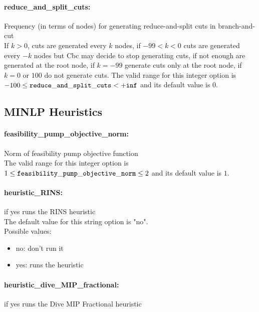 \paragraph{reduce\_and\_split\_cuts:}\label{sec:reduce_and_split_cuts} Frequency (in terms of nodes) for generating reduce-and-split cuts in branch-and-cut $\;$ \\
 If $k > 0$, cuts are generated every $k$ nodes,
if $-99 < k < 0$ cuts are generated every $-k$
nodes but Cbc may decide to stop generating cuts,
if not enough are generated at the root node, if
$k=-99$ generate cuts only at the root node, if
$k=0$ or $100$ do not generate cuts. The valid range for this integer option is
$-100 \le {\tt reduce\_and\_split\_cuts } <  {\tt +inf}$
and its default value is $0$.


\subsection{MINLP Heuristics}
\label{sec:MINLP_Heuristics}
\paragraph{feasibility\_pump\_objective\_norm:}\label{sec:feasibility_pump_objective_norm} Norm of feasibility pump objective function $\;$ \\
 The valid range for this integer option is
$1 \le {\tt feasibility\_pump\_objective\_norm } \le 2$
and its default value is $1$.


\paragraph{heuristic\_RINS:}\label{sec:heuristic_RINS} if yes runs the RINS heuristic $\;$ \\

The default value for this string option is "no".
\\ 
Possible values:
\begin{itemize}
   \item no: don't run it
   \item yes: runs the heuristic
\end{itemize}

\paragraph{heuristic\_dive\_MIP\_fractional:}\label{sec:heuristic_dive_MIP_fractional} if yes runs the Dive MIP Fractional heuristic $\;$ \\

